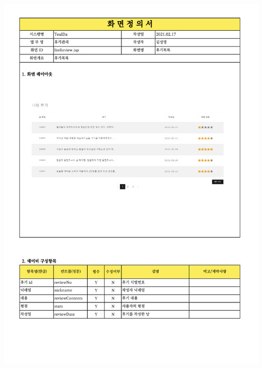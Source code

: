 {{{{{{{{{{{{{{{{{{{{{{{{{{{{{{{{{{{{{{{{{{{{{{{{{{{{{{{{{{{{{{{{{{{{{{{{{{{{\includegraphics[width=20cm]{./Figure/Design/Display/review/review_07.pdf} \\
}}}}}}}}}}}}}}}}}}}}}}}}}}}}}}}}}}}}}}}}}}}}}}}}}}}}}}}}}}}}}}}}}}}}}}}}}}}}
